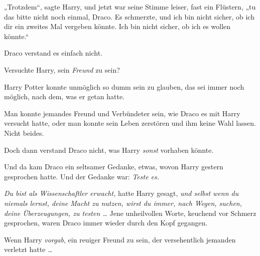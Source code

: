 „Trotzdem“, sagte Harry, und jetzt war seine Stimme leiser, fast ein Flüstern, „tu das bitte nicht noch einmal, Draco. Es schmerzte, und ich bin nicht sicher, ob ich dir ein zweites Mal vergeben könnte. Ich bin nicht sicher, ob ich es wollen könnte.“

Draco verstand es einfach nicht.

Versuchte Harry, sein \emph{Freund} zu sein?

Harry Potter konnte unmöglich so dumm sein zu glauben, das sei immer noch möglich, nach dem, was er getan hatte.

Man konnte jemandes Freund und Verbündeter sein, wie Draco es mit Harry versucht hatte, oder man konnte sein Leben zerstören und ihm keine Wahl lassen. Nicht beides.

Doch dann verstand Draco nicht, was Harry \emph{sonst} vorhaben könnte.

Und da kam Draco ein seltsamer Gedanke, etwas, wovon Harry gestern gesprochen hatte.
Und der Gedanke war: \emph{Teste es.}

\emph{Du bist als Wissenschaftler erwacht,} hatte Harry gesagt, \emph{und selbst wenn du niemals lernst, deine Macht zu nutzen, wirst du immer, nach Wegen, suchen, deine Überzeugungen, zu testen …} Jene unheilvollen Worte, keuchend vor Schmerz gesprochen, waren Draco immer wieder durch den Kopf gegangen.

Wenn Harry \emph{vorgab}, ein reuiger Freund zu sein, der versehentlich jemanden verletzt hatte …

